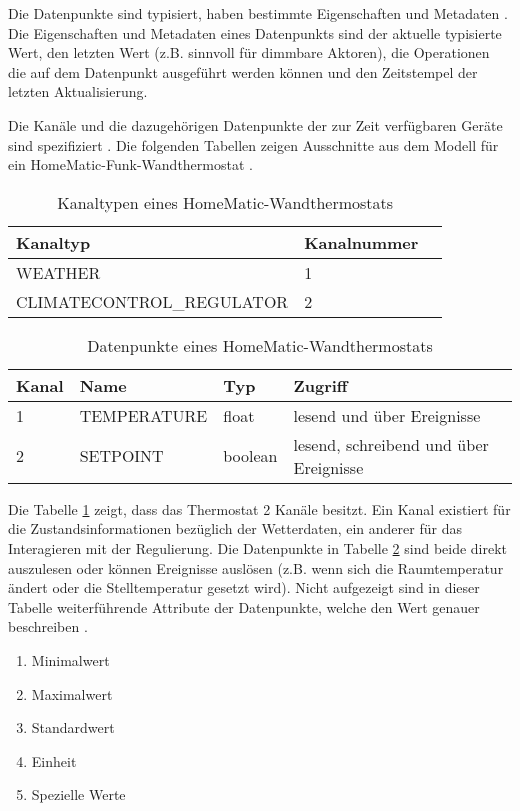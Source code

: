 Die Datenpunkte sind typisiert, haben bestimmte Eigenschaften und Metadaten \cite[Seite 21]{hmscript2}.
Die Eigenschaften und Metadaten eines Datenpunkts sind der aktuelle typisierte Wert, den letzten Wert
(z.B. sinnvoll für dimmbare Aktoren), die Operationen die auf dem Datenpunkt ausgeführt werden können
und den Zeitstempel der letzten Aktualisierung.

Die Kanäle und die dazugehörigen Datenpunkte der zur Zeit verfügbaren Geräte sind
spezifiziert \cite{hmscript4}.
Die folgenden Tabellen zeigen Ausschnitte aus dem Modell für ein
HomeMatic-Funk-Wandthermostat \cite[Seite 12]{hmscript4}.

\begin{table}[h]
\begin{tabular}{|l|l|l|}
\hline
Kanaltyp & Kanalnummer \\
\hline
WEATHER & 1 \\
\hline
CLIMATECONTROL\_REGULATOR & 2 \\
\hline
\end{tabular}
\caption{Kanaltypen eines HomeMatic-Wandthermostats}
\label{tab_hm_chan}
\end{table}

\begin{table}[h]
\begin{tabular}{|l|l|l|l|}
\hline
Kanal & Name & Typ & Zugriff \\
\hline
1 & TEMPERATURE & float & lesend und über Ereignisse \\
\hline
2 & SETPOINT & boolean & lesend, schreibend und über Ereignisse \\
\hline
\end{tabular}
\caption{Datenpunkte eines HomeMatic-Wandthermostats}
\label{tab_hm_dp}
\end{table}

Die Tabelle \ref{tab_hm_chan} zeigt, dass das Thermostat 2 Kanäle besitzt.
Ein Kanal existiert für die Zustandsinformationen bezüglich der Wetterdaten, ein anderer
für das Interagieren mit der Regulierung.
Die Datenpunkte in Tabelle \ref{tab_hm_dp} sind beide direkt auszulesen oder können
Ereignisse auslösen (z.B. wenn sich die Raumtemperatur ändert oder die Stelltemperatur
gesetzt wird).
Nicht aufgezeigt sind in dieser Tabelle weiterführende Attribute der Datenpunkte, welche
den Wert genauer beschreiben \cite[Seite 3]{hmscript4}.

\begin{enumerate}
\item Minimalwert
\item Maximalwert
\item Standardwert
\item Einheit
\item Spezielle Werte
\end{enumerate}

